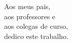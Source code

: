 \pretextualchapter{}

\vspace{8cm}

\begin{flushright}
\hfill \textnormal{
Aos meus pais, \\
aos professores e \\
aos colegas de curso,\\
dedico este trabalho.
}
\end{flushright}
